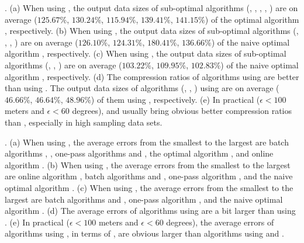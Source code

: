 \emph{}.
(a) When using \ped, the output data sizes of sub-optimal algorithms (\tpa,
\dpa, \bqsa, \siped, \operb) are on average ($125.67\%$, $130.24\%$, $115.94\%$, $139.41\%$, $141.15\%$)
of the optimal algorithm \opt, respectively.
(b) When using \sed, the output data sizes of sub-optimal algorithms (\tpa,
\dpa, \squishe, \cised) are on average ($126.10\%$, $124.31\%$, $180.41\%$, $136.66\%$) of the naive optimal algorithm \opt, respectively.
(c) When using \dad, the output data sizes of sub-optimal algorithms (\tpa,
\dpa, \interval) are on average ($103.22\%$, $109.95\%$, $102.83\%$) of the naive optimal algorithm \opt, respectively.
(d) The compression ratios of algorithms using \ped are better than
using \sed. The output data sizes of algorithms (\opt, \tpa, \dpa) using \ped
are on average ($46.66\%$, $46.64\%$, $48.96\%$) of them using \sed, respectively.
(e) In practical (\eg $\epsilon <100$ meters and $\epsilon < 60$ degrees), \ped and \sed usually bring obvious better compression ratios than \dad, especially in high sampling data sets.

\emph{}.
(a) When using \ped, the average errors from the smallest to the largest are batch algorithms \tpa, \dpa, one-pass algorithms \siped and \operb, the optimal algorithm \opt, and online algorithm \bqsa.
(b) When using \sed, the average errors from the smallest to the largest are online algorithm \squishe, batch algorithms \tpa and \dpa, one-pass algorithm \cised, and the naive optimal algorithm \opt.
(c) When using \dad, the average errors from the smallest
to the largest are batch algorithms \dpa and \tpa, one-pass algorithm \interval, and the naive optimal algorithm \opt.
(d) The average errors of algorithms using \sed are a bit larger than using \ped.
(e) In practical (\eg $\epsilon <100$ meters and $\epsilon < 60$ degrees), the average errors of algorithms using \dad, in terms of \ped, are obvious larger than algorithms using \ped and \sed.

